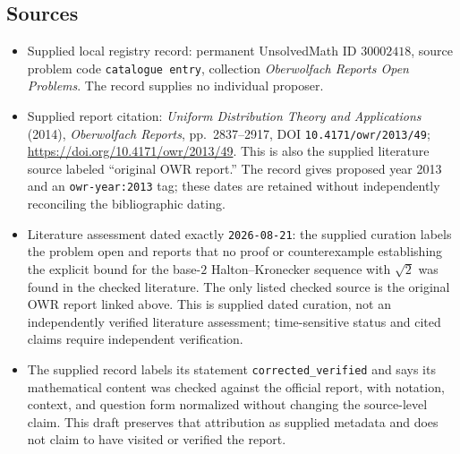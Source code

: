 \documentclass[11pt]{article}
\begin{document}
\subsection{Sources}
\begin{itemize}
\item Supplied local registry record: permanent UnsolvedMath ID \(30002418\), source problem code \texttt{catalogue entry}, collection \emph{Oberwolfach Reports Open Problems}. The record supplies no individual proposer.
\item Supplied report citation: \emph{Uniform Distribution Theory and Applications} (2014), \emph{Oberwolfach Reports}, pp.\ 2837--2917, DOI \texttt{10.4171/owr/2013/49}; \url{https://doi.org/10.4171/owr/2013/49}. This is also the supplied literature source labeled ``original OWR report.'' The record gives proposed year 2013 and an \texttt{owr-year:2013} tag; these dates are retained without independently reconciling the bibliographic dating.
\item Literature assessment dated exactly \texttt{2026-08-21}: the supplied curation labels the problem open and reports that no proof or counterexample establishing the explicit bound for the base-\(2\) Halton--Kronecker sequence with \(\sqrt{2}\) was found in the checked literature. The only listed checked source is the original OWR report linked above. This is supplied dated curation, not an independently verified literature assessment; time-sensitive status and cited claims require independent verification.
\item The supplied record labels its statement \texttt{corrected\_verified} and says its mathematical content was checked against the official report, with notation, context, and question form normalized without changing the source-level claim. This draft preserves that attribution as supplied metadata and does not claim to have visited or verified the report.
\end{itemize}
\end{document}
